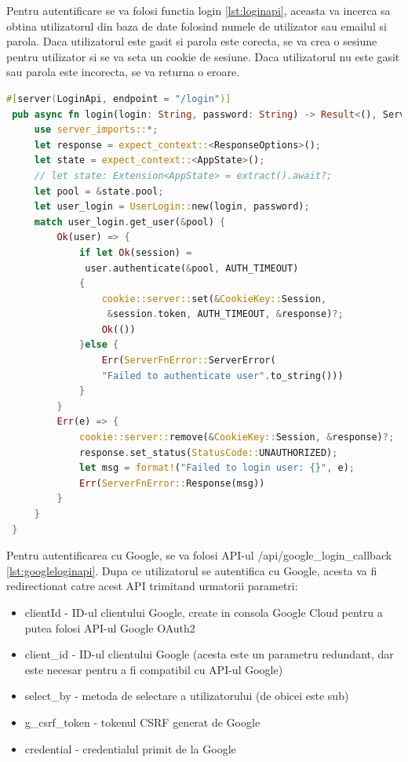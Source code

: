 \documentclass[titlepage,12pt]{article}
\DeclareRobustCommand{\code}[1]{{\ttfamily\small #1}}
\begin{document}
 Pentru autentificare se va folosi functia \code{login} \cref{lst:loginapi}, aceasta va incerca sa obtina utilizatorul din baza de date folosind numele de utilizator sau emailul si parola. Daca utilizatorul este gasit si parola este corecta, se va crea o sesiune pentru utilizator si se va seta un cookie de sesiune. Daca utilizatorul nu este gasit sau parola este incorecta, se va returna o eroare.
 \begin{lstlisting}[language=Rust,caption={API pentru autentificare},label={lst:loginapi}]
 #[server(LoginApi, endpoint = "/login")]
 pub async fn login(login: String, password: String) -> Result<(), ServerFnError> {
     use server_imports::*;
     let response = expect_context::<ResponseOptions>();
     let state = expect_context::<AppState>();
     // let state: Extension<AppState> = extract().await?;
     let pool = &state.pool;
     let user_login = UserLogin::new(login, password);
     match user_login.get_user(&pool) {
         Ok(user) => {
             if let Ok(session) =
              user.authenticate(&pool, AUTH_TIMEOUT)
             {
                 cookie::server::set(&CookieKey::Session,
                  &session.token, AUTH_TIMEOUT, &response)?;
                 Ok(())
             }else {
                 Err(ServerFnError::ServerError(
                 "Failed to authenticate user".to_string()))
             }
         }
         Err(e) => {
             cookie::server::remove(&CookieKey::Session, &response)?;
             response.set_status(StatusCode::UNAUTHORIZED);
             let msg = format!("Failed to login user: {}", e);
             Err(ServerFnError::Response(msg))
         }
     }
 }
 \end{lstlisting}

 Pentru autentificarea cu Google, se va folosi API-ul \code{/api/google\_login\_callback} \cref{lst:googleloginapi}. Dupa ce utilizatorul se autentifica cu Google, acesta va fi redirectionat catre acest API trimitand urmatorii parametri:
\begin{itemize}
    \item \code{clientId} - ID-ul clientului Google, create in consola Google Cloud pentru a putea folosi API-ul Google OAuth2
    \item \code{client\_id} - ID-ul clientului Google (acesta este un parametru redundant, dar este necesar pentru a fi compatibil cu API-ul Google)
    \item \code{select\_by} - metoda de selectare a utilizatorului (de obicei este \code{sub})
    \item \code{g\_csrf\_token} - tokenul CSRF generat de Google
    \item \code{credential} - credentialul primit de la Google
\end{itemize}
\end{document}
